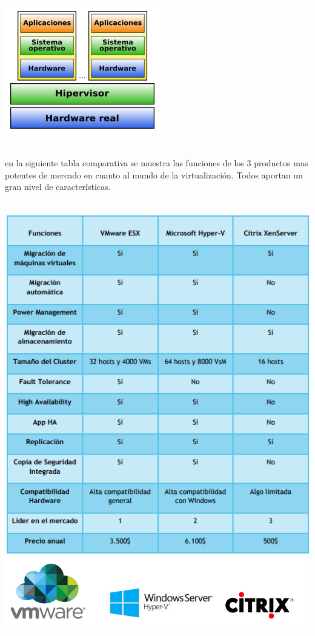 \documentclass[12pt,letterpaper]{article}
\begin{document}
\begin{center}
\includegraphics[scale=1]{IMAGENES/hypervisor.png}  
\end{center}
\\
en la siguiente tabla comparativa se muestra las funciones de los 3 productos mas potentes de mercado en cuanto al mundo de la virtualización. Todos aportan un gran nivel de características. \\ \\

\begin{center}
\includegraphics[scale=1]{IMAGENES/tabla.png}  
\includegraphics[scale=1]{IMAGENES/img2.png} 
\end{center}
\end{document}

